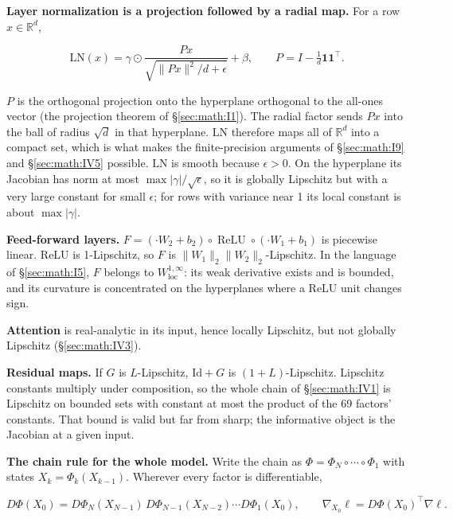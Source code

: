 \textbf{Layer normalization is a projection followed by a radial map.}
For a row \(x \in \mathbb{R}^{d}\),

\[
\mathrm{LN}(x) = \gamma \odot \frac{Px}{\sqrt{\|Px\|^2/d + \epsilon}} + \beta, \qquad P = I - \tfrac{1}{d}\mathbf 1\mathbf 1^\top .
\]

\(P\) is the orthogonal projection onto the hyperplane orthogonal to the
all-ones vector (the projection theorem of \S\ref{sec:math:I1}). The radial factor
sends \(Px\) into the ball of radius \(\sqrt{d}\) in that hyperplane. \(\mathrm{LN}\) therefore
maps all of \(\mathbb{R}^{d}\) into a compact set, which is what makes
the finite-precision arguments of \S\ref{sec:math:I9} and \S\ref{sec:math:IV5} possible. \(\mathrm{LN}\) is smooth because \(\epsilon
> 0\). On the hyperplane its Jacobian has norm at most
\(\max|\gamma|/\sqrt{\epsilon}\), so it is globally Lipschitz but with a very
large constant for small \(\epsilon\); for rows with variance near 1 its local
constant is about \(\max|\gamma|\).

\textbf{Feed-forward layers.} \(F = ({\cdot}W_{2} + b_{2})\circ\operatorname{ReLU}\circ
({\cdot}W_{1} + b_{1})\) is piecewise linear. ReLU is 1-Lipschitz, so \(F\)
is \(\|W_{1}\|_{2}\|W_{2}\|_{2}\)-Lipschitz. In the language of
\S\ref{sec:math:I5}, \(F\) belongs to \(W^{1,\infty}_{\mathrm{loc}}\): its weak derivative exists and is
bounded, and its curvature is concentrated on the hyperplanes where a
ReLU unit changes sign.

\textbf{Attention} is real-analytic in its input, hence locally
Lipschitz, but not globally Lipschitz (\S\ref{sec:math:IV3}).

\textbf{Residual maps.} If \(G\) is \(L\)-Lipschitz, \(\mathrm{Id} + G\) is
\((1 + L)\)-Lipschitz. Lipschitz constants multiply under composition, so the
whole chain of \S\ref{sec:math:IV1} is Lipschitz on bounded sets with constant at most
the product of the 69 factors' constants. That bound is valid but far
from sharp; the informative object is the Jacobian at a given input.

\textbf{The chain rule for the whole model.} Write the chain as \(\Phi = \Phi_N
\circ\cdots\circ\Phi_{1}\) with states \(X_k = \Phi_k(X_{k-1})\). Wherever every factor
is differentiable,

\[
D\Phi(X_0) = D\Phi_N(X_{N-1})\, D\Phi_{N-1}(X_{N-2}) \cdots D\Phi_1(X_0), \qquad \nabla_{X_0}\ell = D\Phi(X_0)^\top \nabla \ell .
\]

